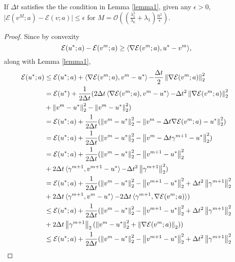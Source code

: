 \begin{thm}
	\label{theorem:one}
	If $\Delta t$ satisfies the the condition in Lemma \ref{lemma1}, given any $\epsilon > 0$, $\vert \mathcal{E}(v^M;a) - \mathcal{E}(v;a)\vert \leq \epsilon$ for $M = \mathcal{O}((\frac{\lambda_{1}^2}{\lambda_{0}} + \lambda_{1}) \frac{n^2}{\epsilon})$.
	\begin{proof}
		Since by convexity 
		\begin{equation}
			\mathcal{E}(u^*;a) - \mathcal{E}(v^m;a) \geq \mathop{\langle \nabla \mathcal{E}(v^m;a), u^* - v^m \rangle},
		\end{equation}
		along with Lemma \ref{lemma1},
		\begin{align*}
			\mathcal{E}(u^*;a) &\leq \mathcal{E}(u^*;a) + \innerProduct{\nabla \mathcal{E}(v^m;a)}{v^m - u^*} - \frac{\Delta t }{2} \norm{\nabla \mathcal{E}(v^m;a)}_{2}^{2}\\
			&= \mathcal{E}(u^*) + \frac{1}{2\Delta t} (2\Delta t \innerProduct{\nabla \mathcal{E}(v^m;a)}{ v^m - u^*} - \Delta t^2 \norm{\nabla \mathcal{E}(v^m;a)}_{2}^{2} \\
			&+ \norm{v^m - u^*}_{2}^{2} - \norm{v^m - u^*}_{2}^{2})\\
			&= \mathcal{E}(u^*;a) + \frac{1}{2 \Delta t}(\norm{v^m-u^*}_{2}^{2} - \norm{v^m - \Delta t \nabla \mathcal{E}(v^m;a) - u^*}_{2}^{2})\\
			&= \mathcal{E}(u^*;a) + \frac{1}{2 \Delta t}(\norm{v^m-u^*}_{2}^{2} - \norm{v^m - \Delta t \gamma^{m+1} - u^*}_{2}^{2})\\
			&= \mathcal{E}(u^*;a) + \frac{1}{2 \Delta t}(\norm{v^m-u^*}_{2}^{2} - \norm{v^{m+1} - u^*}_{2}^{2}\\
			&+ 2\Delta t \innerProduct{\gamma^{m+1}}{v^{m+1}-u^*} - \Delta t^2 \norm{\gamma^{m+1}}_{2}^{2})\\
			&= \mathcal{E}(u^*;a) + \frac{1}{2 \Delta t}(\norm{v^m-u^*}_{2}^{2} - \norm{v^{m+1} - u^*}_{2}^{2} + \Delta t^2 \norm{\gamma^{m+1}}_{2}^{2}\\
			&+ 2\Delta t \innerProduct{\gamma^{m+1}}{v^{m}-u^*} - 2\Delta t \innerProduct{\gamma^{m+1}}{\nabla \mathcal{E}(v^m;a)})\\
			&\leq \mathcal{E}(u^*;a) + \frac{1}{2 \Delta t}(\norm{v^m-u^*}_{2}^{2} - \norm{v^{m+1} - u^*}_{2}^{2} + \Delta t^2 \norm{\gamma^{m+1}}_{2}^{2}\\
			&+ 2\Delta t \norm{\gamma^{m+1}}_{2} (\norm{v^m - u^*}_{2}^{2} + \norm{\nabla \mathcal{E}(v^m;a)}_{2}))\\
			&\leq \mathcal{E}(u^*;a) + \frac{1}{2 \Delta t}(\norm{v^m-u^*}_{2}^{2} - \norm{v^{m+1} - u^*}_{2}^{2} + \Delta t^2 \norm{\gamma^{m+1}}_{2}^{2}\\

\end{align*}
\end{proof}
\end{thm}
